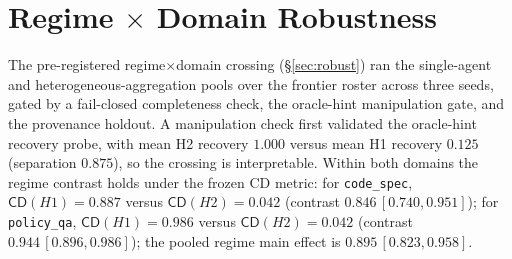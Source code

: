 \documentclass[acmsmall,screen,review,anonymous]{acmart}
\newcommand{\cd}{\textsf{CD}}
\begin{document}
\section{Regime $\times$ Domain Robustness}
\label{app:domain}
The pre-registered regime$\times$domain crossing (\S\ref{sec:robust}) ran the single-agent and
heterogeneous-aggregation pools over the frontier roster across three seeds, gated by a fail-closed
completeness check, the oracle-hint manipulation gate, and the provenance holdout. A manipulation check first
validated the oracle-hint recovery probe, with mean H2 recovery $1.000$ versus mean H1 recovery $0.125$
(separation $0.875$), so the crossing is interpretable. Within both domains the regime contrast holds under
the frozen \cd{} metric: for \texttt{code\_spec}, $\cd(H1)=0.887$ versus $\cd(H2)=0.042$ (contrast
$0.846\,[0.740,0.951]$); for \texttt{policy\_qa}, $\cd(H1)=0.986$ versus $\cd(H2)=0.042$ (contrast
$0.944\,[0.896,0.986]$); the pooled regime main effect is $0.895\,[0.823,0.958]$.
\end{document}

